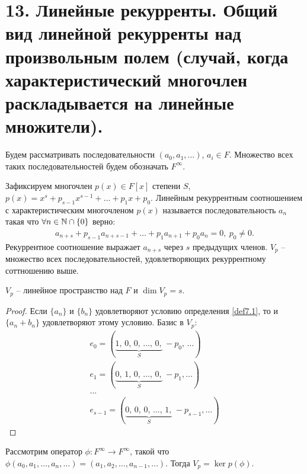 \section{13. Линейные рекурренты. Общий вид линейной рекурренты над произвольным полем (случай, когда характеристический многочлен раскладывается на линейные множители).}

\begin{definition}
    Будем рассматривать последовательности $(a_0, a_1, \dots)$, $a_i \in F$. Множество всех таких 
    последовательностей будем обозначать $F^{\infty}$.
\end{definition}

\begin{definition}
    \label{def7.1}
    Зафиксируем многочлен $p(x) \in F[x]$ степени $S$, 
    $p(x) = x^s + p_{s-1} x^{s-1} + \ldots + p_1 x + p_0$.
    Линейным рекуррентным соотношением с характеристическим многочленом $p(x)$ 
    называется последовательность $a_n$ такая что $\forall n \in \mathbb{N} \cap \{0\}$ верно:
    \begin{eqnarray*}
        a_{n+s} + p_{s-1} a_{n + s - 1} + \ldots + p_1 a_{n+1} + p_0 a_n = 0, \: p_0 \neq 0.
    \end{eqnarray*}
    Рекуррентное соотношение выражает $a_{n + s}$ через $s$ предыдущих членов.
    $V_p$ -- множество всех последовательностей, удовлетворяющих рекуррентному соттношению выше.
\end{definition}

\begin{proposition}
    $V_p$ -- линейное пространство над $F$ и $\dim V_p = s$.
\end{proposition}

\begin{proof}
    Если $\{a_n\}$ и $\{ b_n \}$ удовлетворяют условию определения \ref{def7.1}, 
    то и $\{a_n + b_n\}$ удовлетворяют этому условию.
    Базис в $V_p$:
    \begin{gather*}
        e_0 = (\underbrace{1,\, 0,\, 0,\, \dots,\, 0,}_{S}\, -p_0,\, \dots) \\
        e_1 = (\underbrace{0,\, 1,\, 0,\, \dots,\, 0,}_{S}\, -p_1, \dots) \\
        \dots \\
        e_{s-1} = (\underbrace{0,\, 0,\, 0,\, \dots,\, 1,}_{S}\, -p_{s-1}, \dots)
    \end{gather*}
\end{proof}

\begin{proposition}
    \label{pr7.2}
    Рассмотрим оператор $\phi: F^{\infty} \to F^{\infty}$, такой что 
    $\phi(a_0, a_1, \dots, a_n, \dots) = (a_1, a_2, \dots, a_{n-1}, \dots)$. 
    Тогда $V_p = \ker p(\phi)$.
\end{proposition}

